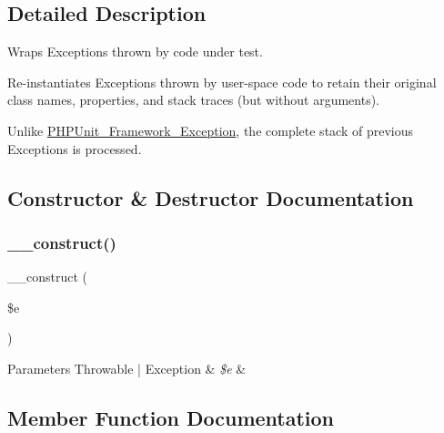 \subsection{Detailed Description}
Wraps Exceptions thrown by code under test.

Re-\/instantiates Exceptions thrown by user-\/space code to retain their original class names, properties, and stack traces (but without arguments).

Unlike \mbox{\hyperlink{class_p_h_p_unit___framework___exception}{P\+H\+P\+Unit\+\_\+\+Framework\+\_\+\+Exception}}, the complete stack of previous Exceptions is processed. 

\subsection{Constructor \& Destructor Documentation}
\mbox{\label{class_p_h_p_unit___framework___exception_wrapper_a8bc6f81fd93ac33e9209747b8dcf04e7}} 
\subsubsection{\texorpdfstring{\+\_\+\+\_\+construct()}{\_\_construct()}}
{\footnotesize\ttfamily \+\_\+\+\_\+construct (\begin{DoxyParamCaption}\item[{}]{\$e }\end{DoxyParamCaption})}


\begin{DoxyParams}[1]{Parameters}
Throwable | Exception & {\em \$e} & \\
\hline
\end{DoxyParams}


\subsection{Member Function Documentation}
\mbox{\label{class_p_h_p_unit___framework___exception_wrapper_a7516ca30af0db3cdbf9a7739b48ce91d}} 
